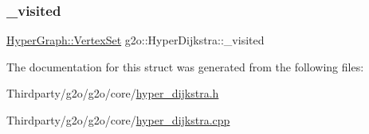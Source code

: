 \mbox{\label{structg2o_1_1_hyper_dijkstra_ad43cae6d9e1df2cf7db839f504ba6cc5}} 
\subsubsection{\texorpdfstring{\+\_\+visited}{\_visited}}
{\footnotesize\ttfamily \mbox{\hyperlink{classg2o_1_1_hyper_graph_a703938cdb4bb636860eed55a2489d70c}{Hyper\+Graph\+::\+Vertex\+Set}} g2o\+::\+Hyper\+Dijkstra\+::\+\_\+visited\hspace{0.3cm}{\ttfamily [protected]}}



The documentation for this struct was generated from the following files\+:\begin{DoxyCompactItemize}
\item 
Thirdparty/g2o/g2o/core/\mbox{\hyperlink{hyper__dijkstra_8h}{hyper\+\_\+dijkstra.\+h}}\item 
Thirdparty/g2o/g2o/core/\mbox{\hyperlink{hyper__dijkstra_8cpp}{hyper\+\_\+dijkstra.\+cpp}}\end{DoxyCompactItemize}
